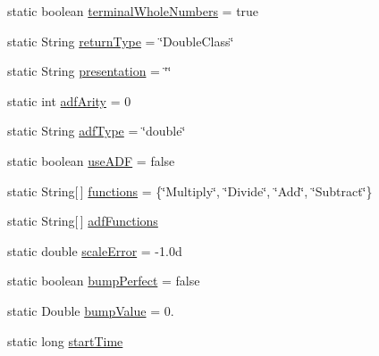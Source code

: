 \begin{DoxyCompactItemize}
\item 
static boolean \hyperlink{classexamples_1_1gp_1_1symbolic_regression_1_1_symbolic_regression_afae4503335c172014bb58d7adfd35d3f}{terminal\-Whole\-Numbers} = true
\item 
static String \hyperlink{classexamples_1_1gp_1_1symbolic_regression_1_1_symbolic_regression_a77c395337e561c5dc584da9a3e200fc0}{return\-Type} = \char`\"{}Double\-Class\char`\"{}
\item 
static String \hyperlink{classexamples_1_1gp_1_1symbolic_regression_1_1_symbolic_regression_ad6b0a1e41c631b55e3a6ed93dd871ea6}{presentation} = \char`\"{}\char`\"{}
\item 
static int \hyperlink{classexamples_1_1gp_1_1symbolic_regression_1_1_symbolic_regression_a6306199eec50bb60282902256b811e0c}{adf\-Arity} = 0
\item 
static String \hyperlink{classexamples_1_1gp_1_1symbolic_regression_1_1_symbolic_regression_a66848d80715e58f5287c6a1278c1debf}{adf\-Type} = \char`\"{}double\char`\"{}
\item 
static boolean \hyperlink{classexamples_1_1gp_1_1symbolic_regression_1_1_symbolic_regression_a445e765c5dbed4c15269f00f5c891f01}{use\-A\-D\-F} = false
\item 
static String\mbox{[}$\,$\mbox{]} \hyperlink{classexamples_1_1gp_1_1symbolic_regression_1_1_symbolic_regression_a0b927896439021fdfefc038f4da13134}{functions} = \{\char`\"{}Multiply\char`\"{}, \char`\"{}Divide\char`\"{}, \char`\"{}Add\char`\"{}, \char`\"{}Subtract\char`\"{}\}
\item 
static String\mbox{[}$\,$\mbox{]} \hyperlink{classexamples_1_1gp_1_1symbolic_regression_1_1_symbolic_regression_a89be9b677272448c7fe4cc4d53e4570f}{adf\-Functions}
\item 
static double \hyperlink{classexamples_1_1gp_1_1symbolic_regression_1_1_symbolic_regression_a2211f414599fe21341db16918a44edb6}{scale\-Error} = -\/1.\-0d
\item 
static boolean \hyperlink{classexamples_1_1gp_1_1symbolic_regression_1_1_symbolic_regression_aed2c9425ba0dee6ce09506ec67377b80}{bump\-Perfect} = false
\item 
static Double \hyperlink{classexamples_1_1gp_1_1symbolic_regression_1_1_symbolic_regression_adaa96c1e44db3faf9afaf2f689bd3269}{bump\-Value} = 0.
\item 
static long \hyperlink{classexamples_1_1gp_1_1symbolic_regression_1_1_symbolic_regression_aaa3d1f6f6f8ef58b3ac3df7d9689246b}{start\-Time}
\item 

\end{DoxyCompactItemize}
